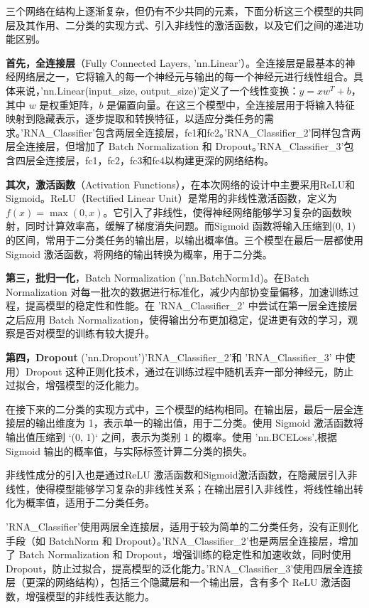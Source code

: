\documentclass[a4paper,11pt,AutoFakeBold]{ctexart}
\begin{document}
三个网络在结构上逐渐复杂，但仍有不少共同的元素，下面分析这三个模型的共同层及其作用、二分类的实现方式、引入非线性的激活函数，以及它们之间的递进功能区别。

\textbf{首先，全连接层}（Fully Connected Layers, 'nn.Linear'）。全连接层是最基本的神经网络层之一，它将输入的每一个神经元与输出的每一个神经元进行线性组合。具体来说，'nn.Linear(input\_size, output\_size)'定义了一个线性变换：$y = xw^T + b$，其中 $w$ 是权重矩阵，$b$ 是偏置向量。在这三个模型中，全连接层用于将输入特征映射到隐藏表示，逐步提取和转换特征，以适应分类任务的需求。'RNA\_Classifier'包含两层全连接层，fc1和fc2。'RNA\_Classifier\_2'同样包含两层全连接层，但增加了 Batch Normalization 和 Dropout。'RNA\_Classifier\_3'包含四层全连接层，fc1，fc2，fc3和fc4以构建更深的网络结构。

\textbf{其次，激活函数}（Activation Functions），在本次网络的设计中主要采用ReLU和Sigmoid。ReLU（Rectified Linear Unit）是常用的非线性激活函数，定义为 $f(x) = \max(0, x)$。它引入了非线性，使得神经网络能够学习复杂的函数映射，同时计算效率高，缓解了梯度消失问题。而Sigmoid 函数将输入压缩到(0, 1)的区间，常用于二分类任务的输出层，以输出概率值。三个模型在最后一层都使用 Sigmoid 激活函数，将网络的输出转换为概率，用于二分类。

\textbf{第三，批归一化}，Batch Normalization ('nn.BatchNorm1d)。在Batch Normalization 对每一批次的数据进行标准化，减少内部协变量偏移，加速训练过程，提高模型的稳定性和性能。在 'RNA\_Classifier\_2' 中尝试在第一层全连接层之后应用 Batch Normalization，使得输出分布更加稳定，促进更有效的学习，观察是否对模型的训练有较大提升。

\textbf{第四，Dropout} ('nn.Dropout')'RNA\_Classifier\_2'和 'RNA\_Classifier\_3' 中使用）Dropout 这种正则化技术，通过在训练过程中随机丢弃一部分神经元，防止过拟合，增强模型的泛化能力。
   
在接下来的二分类的实现方式中，三个模型的结构相同。在输出层，最后一层全连接层的输出维度为 1，表示单一的输出值，用于二分类。使用 Sigmoid 激活函数将输出值压缩到 `(0, 1)` 之间，表示为类别 1 的概率。使用 'nn.BCELoss',根据 Sigmoid 输出的概率值，与实际标签计算二分类的损失。

非线性成分的引入也是通过ReLU 激活函数和Sigmoid激活函数，在隐藏层引入非线性，使得模型能够学习复杂的非线性关系；在输出层引入非线性，将线性输出转化为概率值，适用于二分类任务。

'RNA\_Classifier'使用两层全连接层，适用于较为简单的二分类任务，没有正则化手段（如 BatchNorm 和 Dropout）。'RNA\_Classifier\_2'也是两层全连接层，增加了 Batch Normalization 和 Dropout，增强训练的稳定性和加速收敛，同时使用 Dropout，防止过拟合，提高模型的泛化能力。'RNA\_Classifier\_3'使用四层全连接层（更深的网络结构），包括三个隐藏层和一个输出层，含有多个 ReLU 激活函数，增强模型的非线性表达能力。
\end{document}
